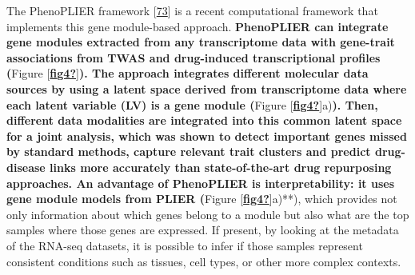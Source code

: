 The PhenoPLIER framework {[}\protect\hyperlink{ref-NM3rHx1i}{73}{]} is a recent computational framework that implements this gene module-based approach.\textbf{
PhenoPLIER can integrate gene modules extracted from any transcriptome data with gene-trait associations from TWAS and drug-induced transcriptional profiles (}Figure {[}\protect\hyperlink{ref-fig4}{\textbf{fig4?}}{]}\textbf{).
The approach integrates different molecular data sources by using a latent space derived from transcriptome data where each latent variable (LV) is a gene module (}Figure {[}\protect\hyperlink{ref-fig4}{\textbf{fig4?}}{]}a)\textbf{).
Then, different data modalities are integrated into this common latent space for a joint analysis, which was shown to detect important genes missed by standard methods, capture relevant trait clusters and predict drug-disease links more accurately than state-of-the-art drug repurposing approaches.
An advantage of PhenoPLIER is interpretability: it uses gene module models from PLIER (}Figure {[}\protect\hyperlink{ref-fig4}{\textbf{fig4?}}{]}a)**), which provides not only information about which genes belong to a module but also what are the top samples where those genes are expressed.
If present, by looking at the metadata of the RNA-seq datasets, it is possible to infer if those samples represent consistent conditions such as tissues, cell types, or other more complex contexts.

